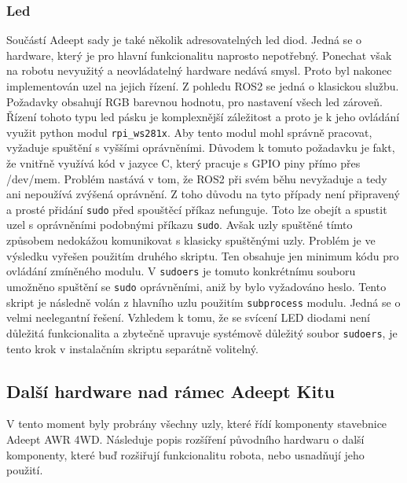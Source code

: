 \subsubsection*{Led}
Součástí Adeept sady je také několik adresovatelných led diod. Jedná se o hardware, který je pro hlavní funkcionalitu naprosto nepotřebný. Ponechat však na robotu nevyužitý a neovládatelný hardware nedává smysl. Proto byl nakonec implementován uzel na jejich řízení. Z pohledu ROS2 se jedná o klasickou službu. Požadavky obsahují RGB barevnou hodnotu, pro nastavení všech led zároveň. Řízení tohoto typu led pásku je komplexnější záležitost a proto je k jeho ovládání využit python modul \verb|rpi_ws281x|. 
Aby tento modul mohl správně pracovat, vyžaduje spuštění s vyššími oprávněními. Důvodem k tomuto požadavku je fakt, že vnitřně využívá kód v jazyce C, který pracuje s GPIO piny přímo přes /dev/mem. Problém nastává v tom, že ROS2 při svém běhu nevyžaduje a tedy ani nepoužívá zvýšená oprávnění. Z toho důvodu na tyto případy není připravený a prosté přidání \verb|sudo| před spouštěcí příkaz nefunguje. Toto lze obejít a spustit uzel s oprávněními podobnými příkazu \verb|sudo|. Avšak uzly spuštěné tímto způsobem nedokážou komunikovat s klasicky spuštěnými uzly. 
Problém je ve výsledku vyřešen použitím druhého skriptu. Ten obsahuje jen minimum kódu pro ovládání zmíněného modulu. V \verb|sudoers| je tomuto konkrétnímu souboru umožněno spuštění se \verb|sudo| oprávněními, aniž by bylo vyžadováno heslo. Tento skript je následně volán z hlavního uzlu použitím \verb|subprocess| modulu. Jedná se o velmi neelegantní řešení. Vzhledem k tomu, že se svícení LED diodami není důležitá funkcionalita a zbytečně upravuje systémově důležitý soubor \verb|sudoers|, je tento krok v instalačním skriptu separátně volitelný.

\subsection*{Další hardware nad rámec Adeept Kitu}
V tento moment byly probrány všechny uzly, které řídí komponenty stavebnice Adeept AWR 4WD. Následuje popis rozšíření původního hardwaru o další komponenty, které buď rozšiřují funkcionalitu robota, nebo usnadňují jeho použití.

